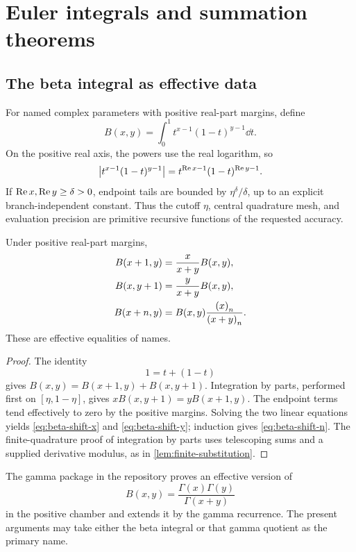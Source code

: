 \section{Euler integrals and summation theorems}\label{sec:integrals-sums}

\subsection{The beta integral as effective data}

For named complex parameters with positive real-part margins, define
\[
 B(x,y)=\int_0^1 t^{x-1}(1-t)^{y-1}\dd t.
\]
On the positive real axis, the powers use the real logarithm, so
\[
 \left|t^{x-1}(1-t)^{y-1}\right|
 =t^{\operatorname{Re} x-1}(1-t)^{\operatorname{Re} y-1}.
\]
If \(\operatorname{Re} x,\operatorname{Re} y\ge\delta>0\), endpoint tails are bounded by
\(\eta^\delta/\delta\), up to an explicit branch-independent constant.
Thus the cutoff \(\eta\), central quadrature mesh, and evaluation precision
are primitive recursive functions of the requested accuracy.

\begin{lemma}\label{lem:beta-shift}
Under positive real-part margins,
\begin{align}
 B(x+1,y)&=\frac{x}{x+y}B(x,y),\label{eq:beta-shift-x}\\
 B(x,y+1)&=\frac{y}{x+y}B(x,y),\label{eq:beta-shift-y}\\
 B(x+n,y)&=B(x,y)\frac{\left(x\right)_{n}}{\left(x+y\right)_{n}}.
 \label{eq:beta-shift-n}
\end{align}
These are effective equalities of names.
\end{lemma}

\begin{proof}
The identity
\[
 1=t+(1-t)
\]
gives \(B(x,y)=B(x+1,y)+B(x,y+1)\).  Integration by parts, performed first
on \([\eta,1-\eta]\), gives
\(xB(x,y+1)=yB(x+1,y)\).  The endpoint terms tend effectively to zero by the
positive margins.  Solving the two linear equations yields
\eqref{eq:beta-shift-x} and \eqref{eq:beta-shift-y}; induction gives
\eqref{eq:beta-shift-n}.  The finite-quadrature proof of integration by parts
uses telescoping sums and a supplied derivative modulus, as in
\cref{lem:finite-substitution}.
\end{proof}

The gamma package in the repository proves an effective version of
\[
 B(x,y)=\frac{\Gamma(x)\Gamma(y)}{\Gamma(x+y)}
\]
in the positive chamber and extends it by the gamma recurrence.  The present
arguments may take either the beta integral or that gamma quotient as the
primary name.

